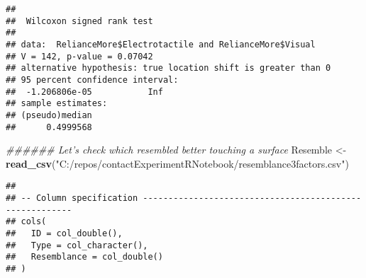 \documentclass[
]{article}
\newenvironment{Shaded}{\begin{snugshade}}{\end{snugshade}}
\newcommand{\CommentTok}[1]{\textcolor[rgb]{0.56,0.35,0.01}{\textit{#1}}}
\newcommand{\DataTypeTok}[1]{\textcolor[rgb]{0.13,0.29,0.53}{#1}}
\newcommand{\KeywordTok}[1]{\textcolor[rgb]{0.13,0.29,0.53}{\textbf{#1}}}
\newcommand{\NormalTok}[1]{#1}
\newcommand{\OperatorTok}[1]{\textcolor[rgb]{0.81,0.36,0.00}{\textbf{#1}}}
\newcommand{\OtherTok}[1]{\textcolor[rgb]{0.56,0.35,0.01}{#1}}
\newcommand{\StringTok}[1]{\textcolor[rgb]{0.31,0.60,0.02}{#1}}
\begin{document}
\begin{Shaded}
\end{Shaded}

\begin{verbatim}
## 
##  Wilcoxon signed rank test
## 
## data:  RelianceMore$Electrotactile and RelianceMore$Visual
## V = 142, p-value = 0.07042
## alternative hypothesis: true location shift is greater than 0
## 95 percent confidence interval:
##  -1.206806e-05           Inf
## sample estimates:
## (pseudo)median 
##      0.4999568
\end{verbatim}

\begin{Shaded}
\begin{Highlighting}[]
\CommentTok{###### Let's check which resembled better touching a surface}
\NormalTok{Resemble <-}\StringTok{ }\KeywordTok{read_csv}\NormalTok{(}\StringTok{"C:/repos/contactExperimentRNotebook/resemblance3factors.csv"}\NormalTok{)}
\end{Highlighting}
\end{Shaded}

\begin{verbatim}
## 
## -- Column specification --------------------------------------------------------
## cols(
##   ID = col_double(),
##   Type = col_character(),
##   Resemblance = col_double()
## )
\end{verbatim}

\begin{Shaded}
\end{Shaded}
\end{document}
